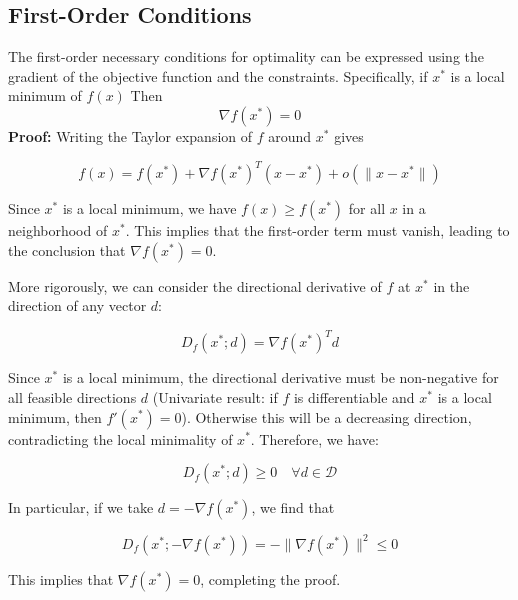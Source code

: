
\subsection{First-Order Conditions}
The first-order necessary conditions for optimality can be expressed using the gradient of the objective function and the constraints. Specifically, if \( x^* \) is a local minimum of \( f(x) \)
Then 
\[ \nabla f(x^*) = 0 \]
\textbf{Proof:} Writing the Taylor expansion of \( f \) around \( x^* \) gives

\[
f(x) = f(x^*) + \nabla f(x^*)^T (x - x^*) + o(\|x - x^*\|)
\]

Since \( x^* \) is a local minimum, we have \( f(x) \geq f(x^*) \) for all \( x \) in a neighborhood of \( x^* \). This implies that the first-order term must vanish, leading to the conclusion that \( \nabla f(x^*) = 0 \).

More rigorously, we can consider the directional derivative of \( f \) at \( x^* \) in the direction of any vector \( d \):

\[
D_f(x^*; d) = \nabla f(x^*)^T d
\]

Since \( x^* \) is a local minimum, the directional derivative must be non-negative for all feasible directions \( d \) (Univariate result: if \( f \) is differentiable and \( x^* \) is a local minimum, then \( f'(x^*) = 0 \)). Otherwise this will be a decreasing direction, contradicting the local minimality of \( x^* \). Therefore, we have:

\[
D_f(x^*; d) \geq 0 \quad \forall d \in \mathcal{D}
\]

In particular, if we take \( d = -\nabla f(x^*) \), we find that

\[
D_f(x^*; -\nabla f(x^*)) = -\|\nabla f(x^*)\|^2 \leq 0
\]

This implies that \( \nabla f(x^*) = 0 \), completing the proof.

